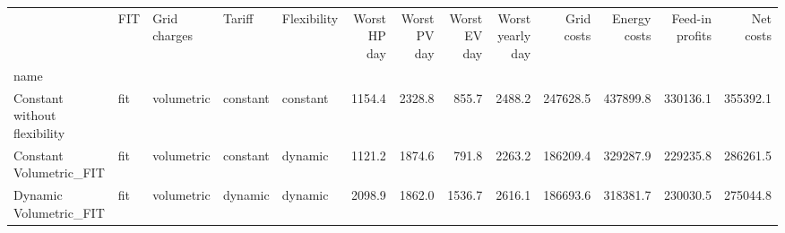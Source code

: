 \begin{tabular}{lllllrrrrrrrr}
\toprule
{} &  FIT & Grid charges &    Tariff & Flexibility &  Worst HP day &  Worst PV day &  Worst EV day &  Worst yearly day &  Grid costs &  Energy costs &  Feed-in profits &  Net costs \\
name                         &      &              &           &             &               &               &               &                   &             &               &                  &            \\
\midrule
Constant without flexibility &  fit &   volumetric &  constant &    constant &        1154.4 &        2328.8 &         855.7 &            2488.2 &    247628.5 &      437899.8 &         330136.1 &   355392.1 \\
Constant Volumetric\_FIT      &  fit &   volumetric &  constant &     dynamic &        1121.2 &        1874.6 &         791.8 &            2263.2 &    186209.4 &      329287.9 &         229235.8 &   286261.5 \\
Dynamic Volumetric\_FIT       &  fit &   volumetric &   dynamic &     dynamic &        2098.9 &        1862.0 &        1536.7 &            2616.1 &    186693.6 &      318381.7 &         230030.5 &   275044.8 \\
\bottomrule
\end{tabular}

